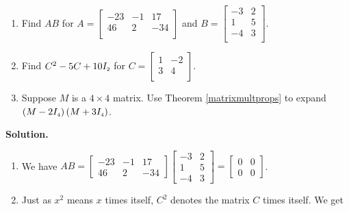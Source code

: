 \documentclass{ximera}
\begin{document}
\begin{ex} \label{matrixmultex}  $~$

\begin{enumerate}

\item  Find $AB$ for $A = \left[ \begin{array}{rrr} -23 & -1 & 17 \\ 46 & 2 & -34 \\ \end{array} \right]$ and $B = \left[ \begin{array}{rr} -3 & 2 \\ 1 & 5 \\ -4 & 3 \\ \end{array} \right]$.


\item  Find $C^2 -5C + 10I_{\mbox{\tiny$2$}}$ for $C = \left[ \begin{array}{rr} 1 & -2 \\ 3 & 4 \\ \end{array} \right]$.

\item  Suppose $M$ is a $4 \times 4$ matrix.  Use Theorem \ref{matrixmultprops} to expand $\left(M - 2I_{\mbox{\tiny$4$}}\right)\left(M + 3I_{\mbox{\tiny$4$}}\right)$.


\end{enumerate}

{\bf Solution.}  

\begin{enumerate}

\item  We have $AB = \left[ \begin{array}{rrr} -23 & -1 & 17 \\ 46 & 2 & -34  \end{array} \right] \left[ \begin{array}{rr} -3 & 2 \\ 1 & 5 \\ -4 & 3  \end{array} \right] =  \left[ \begin{array}{rr} 0 & 0 \\ 0 & 0  \end{array} \right] $.


\item Just as $x^2$ means $x$ times itself, $C^2$ denotes the matrix $C$ times itself.  We get


\end{enumerate}
\end{ex}
\end{document}
